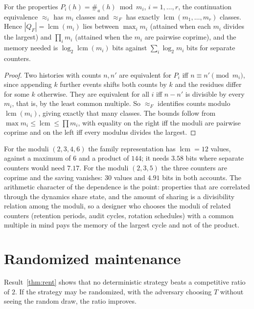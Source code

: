\begin{newresult}\label{prop:lcm}
For the properties $P_i(h)=\#_a(h)\bmod m_i$, $i=1,\dots,r$, the continuation equivalence $\approx_i$ has $m_i$ classes and $\approx_F$ has exactly $\operatorname{lcm}(m_1,\dots,m_r)$ classes. Hence $|Q_F|=\operatorname{lcm}(m_i)$ lies between $\max_im_i$ (attained when each $m_i$ divides the largest) and $\prod_im_i$ (attained when the $m_i$ are pairwise coprime), and the memory needed is $\log_2\operatorname{lcm}(m_i)$ bits against $\sum_i\log_2m_i$ bits for separate counters.
\end{newresult}
\begin{proof}
Two histories with counts $n,n'$ are equivalent for $P_i$ iff $n\equiv n'\pmod{m_i}$, since appending $k$ further events shifts both counts by $k$ and the residues differ for some $k$ otherwise. They are equivalent for all $i$ iff $n-n'$ is divisible by every $m_i$, that is, by the least common multiple. So $\approx_F$ identifies counts modulo $\operatorname{lcm}(m_i)$, giving exactly that many classes. The bounds follow from $\max m_i\le\operatorname{lcm}\le\prod m_i$, with equality on the right iff the moduli are pairwise coprime and on the left iff every modulus divides the largest.
\end{proof}

For the moduli $(2,3,4,6)$ the family representation has $\operatorname{lcm}=12$ values, against a maximum of $6$ and a product of $144$; it needs $3.58$ bits where separate counters would need $7.17$. For the moduli $(2,3,5)$ the three counters are coprime and the saving vanishes: $30$ values and $4.91$ bits in both accounts. The arithmetic character of the dependence is the point: properties that are correlated through the dynamics share state, and the amount of sharing is a divisibility relation among the moduli, so a designer who chooses the moduli of related counters (retention periods, audit cycles, rotation schedules) with a common multiple in mind pays the memory of the largest cycle and not of the product.

\section{Randomized maintenance}\label{sec:randomized-rent}

Result~\ref{thm:rent} shows that no deterministic strategy beats a competitive ratio of $2$. If the strategy may be randomized, with the adversary choosing $T$ without seeing the random draw, the ratio improves.

